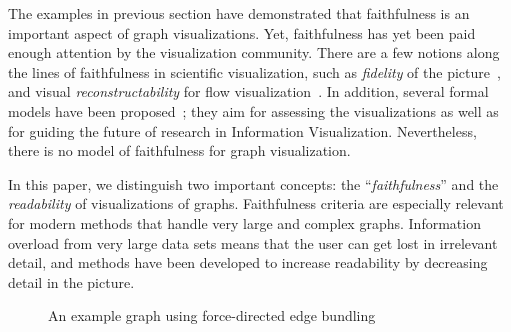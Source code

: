 \documentclass[10pt,journal,cspaper,compsoc]{IEEEtran}
\begin{document}
The examples in previous section have demonstrated that faithfulness is an important aspect of graph visualizations. 
Yet, faithfulness has yet been paid enough attention by the visualization community. There are a few notions along the lines of faithfulness in scientific visualization, such as {\em fidelity} of the
picture~\cite{matsuyama2004real}, and visual \emph{reconstructability}
for flow visualization~\cite{jänicke2011visual}. 
In addition, several formal models have been proposed~\cite{van2005value,purchase2008theoretical,carpendale2008evaluating,chen2009data,lam2011seven}; they aim for assessing the visualizations as well as for guiding the future of research in Information Visualization.
Nevertheless, there is no model of faithfulness for graph visualization.

In this paper, we distinguish two important concepts: the ``\emph{faithfulness}'' and the \emph{readability} of visualizations of graphs.
Faithfulness criteria are especially relevant for modern methods that
handle very large and complex graphs. Information overload from very large data
sets means that the user can get lost in irrelevant detail, and
methods have been developed to increase readability by decreasing
detail in the picture. 


\begin{figure}\centering
{}
\caption{An example graph using force-directed edge bundling}\label{fig:bundling}
\end{figure}
\end{document}
